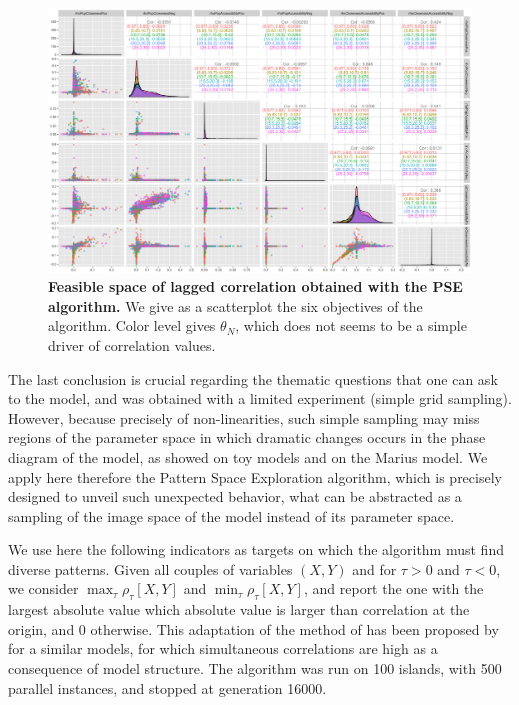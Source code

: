 \documentclass[graybox]{svmult}
\begin{document}
\begin{figure}
	\includegraphics[width=\textwidth]{scatterplot_colornwThreshold.png}
	\caption{\textbf{Feasible space of lagged correlation obtained with the PSE algorithm.} We give as a scatterplot the six objectives of the algorithm. Color level gives $\theta_N$, which does not seems to be a simple driver of correlation values.\label{fig:pse}}
\end{figure}


The last conclusion is crucial regarding the thematic questions that one can ask to the model, and was obtained with a limited experiment (simple grid sampling). However, because precisely of non-linearities, such simple sampling may miss regions of the parameter space in which dramatic changes occurs in the phase diagram of the model, as \cite{cherel2015beyond} showed on toy models and on the Marius model. We apply here therefore the Pattern Space Exploration algorithm, which is precisely designed to unveil such unexpected behavior, what can be abstracted as a sampling of the image space of the model instead of its parameter space.

We use here the following indicators as targets on which the algorithm must find diverse patterns. Given all couples of variables $(X,Y)$ and for $\tau > 0$ and $\tau < 0$, we consider $\max_{\tau} \rho_{\tau}\left[X,Y\right]$ and $\min_{\tau} \rho_{\tau}\left[X,Y\right]$, and report the one with the largest absolute value which absolute value is larger than correlation at the origin, and 0 otherwise. This adaptation of the method of \cite{raimbault2017identification} has been proposed by \cite{2018arXiv180409430R} for a similar models, for which simultaneous correlations are high as a consequence of model structure. The algorithm was run on 100 islands, with 500 parallel instances, and stopped at generation 16000.
\end{document}
